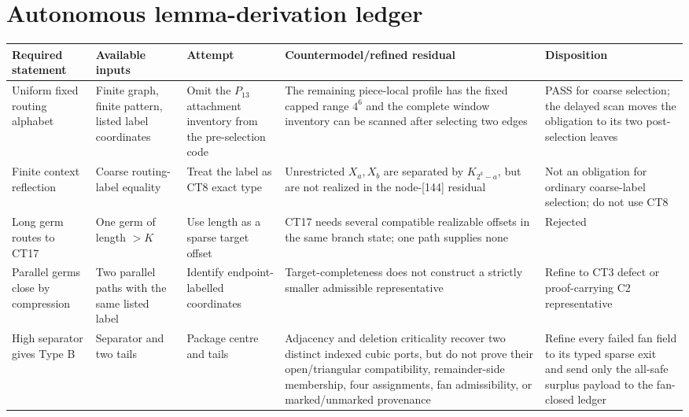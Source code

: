 \documentclass[11pt]{article}
\begin{document}
\section{Autonomous lemma-derivation ledger}

\begin{longtable}{>{\raggedright\arraybackslash}p{}
                  >{\raggedright\arraybackslash}p{}
                  >{\raggedright\arraybackslash}p{}
                  >{\raggedright\arraybackslash}p{}
                  >{\raggedright\arraybackslash}p{}}
\toprule
Required statement & Available inputs & Attempt & Countermodel/refined
residual & Disposition \\
\midrule
Uniform fixed routing alphabet & Finite graph, finite pattern, listed label
coordinates & Omit the $P_{13}$ attachment inventory from the pre-selection
code & The remaining piece-local profile has the fixed capped range $4^6$ and
the complete window inventory can be scanned after selecting two edges & PASS
for coarse selection; the delayed scan moves the obligation to its two
post-selection leaves \\
Finite context reflection & Coarse routing-label equality & Treat the label
as CT8 exact type & Unrestricted $X_a,X_b$ are separated by $K_{2^k-a}$, but
are not realized in the node-[144] residual & Not an obligation for ordinary
coarse-label selection; do not use CT8 \\
Long germ routes to CT17 & One germ of length $>K$ & Use length as a sparse
target offset & CT17 needs several compatible realizable offsets in the same
branch state; one path supplies none & Rejected \\
Parallel germs close by compression & Two parallel paths with the same
listed label & Identify endpoint-labelled coordinates & Target-completeness
does not construct a strictly smaller admissible representative & Refine to
CT3 defect or proof-carrying C2 representative \\
High separator gives Type B & Separator and two tails & Package centre and
tails & Adjacency and deletion criticality recover two distinct indexed cubic
ports, but do not prove their open/triangular compatibility, remainder-side
membership, four assignments, fan admissibility, or marked/unmarked provenance
& Refine every failed fan field to its typed sparse exit and send only the
all-safe surplus payload to the fan-closed ledger \\
\bottomrule
\end{longtable}
\end{document}
